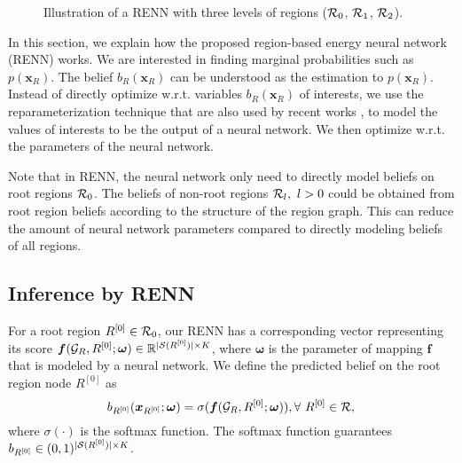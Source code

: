 \begin{figure}[!t]
  
  \caption{Illustration of a RENN with three levels of regions ($\mathcal{R}_0$, $\mathcal{R}_1$, $\mathcal{R}_2$).}
  \label{fig:renn-illustration}
  
\end{figure}


In this section, we explain how the proposed region-based energy neural network (RENN) works.
We are interested in finding marginal probabilities such as $p(\bm{x}_R)$. The belief $b_R(\bm{x}_R)$ can be understood as the estimation to $p(\bm{x}_R)$.
Instead of directly optimize w.r.t. variables ${b_R(\bm{x}_R)}$ of interests, we use the reparameterization technique that are also used by recent works \cite{DBLP:journals/corr/KingmaW13, srikumar-etal-2012-amortizing, NIPS2019_9687, akbayrak2019reparameterization}, to model the values of interests to be the output of a neural network. We then optimize w.r.t. the parameters of the neural network.

Note that in RENN, the neural network only need to directly model beliefs on root regions $\mathcal{R}_0$. The beliefs of non-root regions $\mathcal{R}_l,~l>0$ could be obtained from root region beliefs according to the structure of the region graph. This can reduce the amount of neural network parameters compared to directly modeling beliefs of all regions.

\subsection{Inference by RENN}
\label{sec:infer-renn}

For a root region $R^{[0]}\in \mathcal{R}_0$, our RENN has a corresponding vector representing its score $\bm{f}(\mathcal{G}_R, R^{[0]}; \bm{\omega}) \in \mathbb{R}^{|{\mathcal{S}(R^{[0]})}| \times K}$, where $\bm{\omega}$ is the parameter of mapping $\bm{f}$ that is modeled by a neural network. We define the predicted belief on the root region node $R^{[0]}$ as
\begin{equation}
  b_{R^{[0]}}(\bm{x}_{R^{[0]}}; \bm{\omega}) = \sigma(\bm{f}(\mathcal{G}_R, R^{[0]}; \bm{\omega})), \forall~ {R^{[0]}} \in \mathcal{R},
\end{equation}
where $\sigma(\cdot)$ is the softmax function. The softmax function guarantees $b_{R^{[0]}} \in (0,1)^{|{\mathcal{S}(R^{[0]})}| \times K}$.

